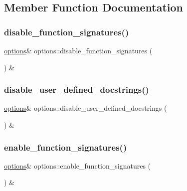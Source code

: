 \subsection{Member Function Documentation}
\mbox{\label{classoptions_af6dce379743c47f9827405ef1039efe3}} 
\subsubsection{\texorpdfstring{disable\_function\_signatures()}{disable\_function\_signatures()}}
{\footnotesize\ttfamily \mbox{\hyperlink{classoptions}{options}}\& options\+::disable\+\_\+function\+\_\+signatures (\begin{DoxyParamCaption}{ }\end{DoxyParamCaption}) \&\hspace{0.3cm}{\ttfamily [inline]}}

\mbox{\label{classoptions_a72b0a4f748e3080e73dbe05e70dd5307}} 
\subsubsection{\texorpdfstring{disable\_user\_defined\_docstrings()}{disable\_user\_defined\_docstrings()}}
{\footnotesize\ttfamily \mbox{\hyperlink{classoptions}{options}}\& options\+::disable\+\_\+user\+\_\+defined\+\_\+docstrings (\begin{DoxyParamCaption}{ }\end{DoxyParamCaption}) \&\hspace{0.3cm}{\ttfamily [inline]}}

\mbox{\label{classoptions_a468cb78d763430aef7d1fe5c4f7a2c22}} 
\subsubsection{\texorpdfstring{enable\_function\_signatures()}{enable\_function\_signatures()}}
{\footnotesize\ttfamily \mbox{\hyperlink{classoptions}{options}}\& options\+::enable\+\_\+function\+\_\+signatures (\begin{DoxyParamCaption}{ }\end{DoxyParamCaption}) \&\hspace{0.3cm}{\ttfamily [inline]}}

